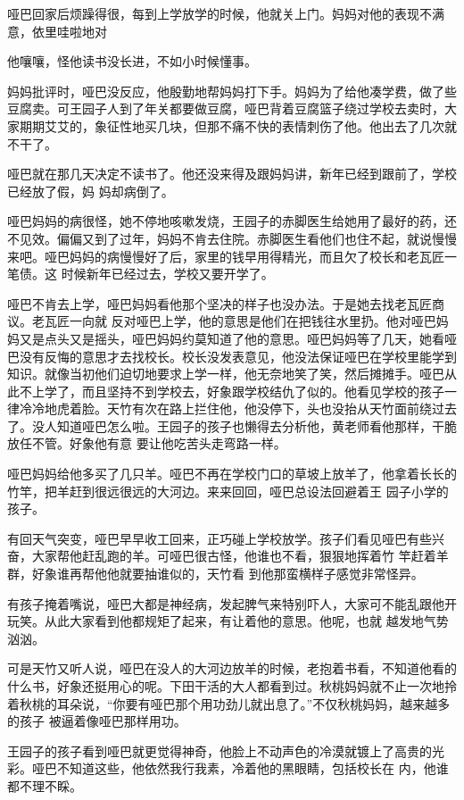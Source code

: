\documentclass{article}
\begin{document}
哑巴回家后烦躁得很，每到上学放学的时候，他就关上门。妈妈对他的表现不满意，依里哇啦地对
\newpage

他嚷嚷，怪他读书没长进，不如小时候懂事。 

妈妈批评时，哑巴没反应，他殷勤地帮妈妈打下手。妈妈为了给他凑学费，做了些豆腐卖。可王园子人到了年关都要做豆腐，哑巴背着豆腐篮子绕过学校去卖时，大家期期艾艾的，象征性地买几块，但那不痛不快的表情刺伤了他。他出去了几次就不干了。

哑巴就在那几天决定不读书了。他还没来得及跟妈妈讲，新年已经到跟前了，学校已经放了假，妈
妈却病倒了。 

哑巴妈妈的病很怪，她不停地咳嗽发烧，王园子的赤脚医生给她用了最好的药，还不见效。偏偏又到了过年，妈妈不肯去住院。赤脚医生看他们也住不起，就说慢慢来吧。哑巴妈妈的病慢慢好了后，家里的钱早用得精光，而且欠了校长和老瓦匠一笔债。这
时候新年已经过去，学校又要开学了。 

哑巴不肯去上学，哑巴妈妈看他那个坚决的样子也没办法。于是她去找老瓦匠商议。老瓦匠一向就
\newpage
反对哑巴上学，他的意思是他们在把钱往水里扔。他对哑巴妈妈又是点头又是摇头，哑巴妈妈约莫知道了他的意思。哑巴妈妈等了几天，她看哑巴没有反悔的意思才去找校长。校长没发表意见，他没法保证哑巴在学校里能学到知识。就像当初他们迫切地要求上学一样，他无奈地笑了笑，然后摊摊手。哑巴从此不上学了，而且坚持不到学校去，好象跟学校结仇了似的。他看见学校的孩子一律冷冷地虎着脸。天竹有次在路上拦住他，他没停下，头也没抬从天竹面前绕过去了。没人知道哑巴怎么啦。王园子的孩子也懒得去分析他，黄老师看他那样，干脆放任不管。好象他有意
要让他吃苦头走弯路一样。 

哑巴妈妈给他多买了几只羊。哑巴不再在学校门口的草坡上放羊了，他拿着长长的竹竿，把羊赶到很远很远的大河边。来来回回，哑巴总设法回避着王
园子小学的孩子。 

有回天气突变，哑巴早早收工回来，正巧碰上学校放学。孩子们看见哑巴有些兴奋，大家帮他赶乱跑的羊。可哑巴很古怪，他谁也不看，狠狠地挥着竹
\newpage
竿赶着羊群，好象谁再帮他他就要抽谁似的，天竹看
到他那蛮横样子感觉非常怪异。 

有孩子掩着嘴说，哑巴大都是神经病，发起脾气来特别吓人，大家可不能乱跟他开玩笑。从此大家看到他都规矩了起来，有让着他的意思。他呢，也就
越发地气势汹汹。 

可是天竹又听人说，哑巴在没人的大河边放羊的时候，老抱着书看，不知道他看的什么书，好象还挺用心的呢。下田干活的大人都看到过。秋桃妈妈就不止一次地拎着秋桃的耳朵说，“你要有哑巴那个用功劲儿就出息了。”不仅秋桃妈妈，越来越多的孩子
被逼着像哑巴那样用功。 

王园子的孩子看到哑巴就更觉得神奇，他脸上不动声色的冷漠就镀上了高贵的光彩。哑巴不知道这些，他依然我行我素，冷着他的黑眼睛，包括校长在
内，他谁都不理不睬。 
\end{document}
